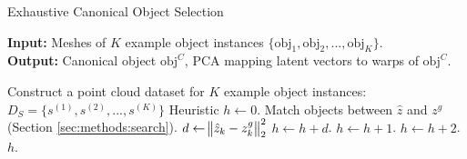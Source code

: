 \documentclass{article}
\begin{document}
\begin{algorithm}[H]

\caption{Exhaustive Canonical Object Selection}\label{alg:canon_select_1} 

\begin{flushleft}
    \hspace*{\algorithmicindent} \textbf{Input:} Meshes of $K$ example object instances $\{ \mathrm{obj}_1, \mathrm{obj}_2, ..., \mathrm{obj}_K \}$. \\
    \hspace*{\algorithmicindent} \textbf{Output:} Canonical object $\mathrm{obj}^C$, $\mathrm{PCA}$ mapping latent vectors to warps of $\mathrm{obj}^C$. \\
\end{flushleft}

\begin{algorithmic}[1]

    \State Construct a point cloud dataset for $K$ example object instances: $D_S = \{ s^{(1)}, s^{(2)}, ..., s^{(K)} \}$
    \State Heuristic $h \leftarrow 0$.
    \State Match objects between $\hat{z}$ and $z^g$ (Section \ref{sec:methods:search}).
        \State $d \leftarrow \norm{\hat{z}_k - z^g_k}^2_2$
            \State $h \leftarrow h + d$. 
            \State $h \leftarrow h + 1$. 
        \Else
            \State $h \leftarrow h + 2$. 
        \EndIf
    \EndFor
    \State \Return $h$.

\end{algorithmic}

\end{algorithm}
\end{document}
